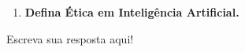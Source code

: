 \begin{enumerate}\bfseries
    \item \textbf{Defina Ética em Inteligência Artificial. }
\end{enumerate}

Escreva sua resposta aqui!